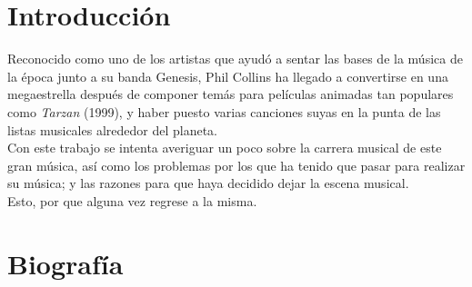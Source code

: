 \documentclass[11pt, oneside]{book}
\begin{document}
  \setcounter{page}{0}

  \tableofcontents
  
  \chapter*{Introducción}

  Reconocido como uno de los artistas que ayudó a sentar las bases de la música de la época junto a su banda Genesis, Phil Collins ha llegado a convertirse en una megaestrella después de componer temás para películas animadas tan populares como \emph{Tarzan} (1999), y haber puesto varias canciones suyas en la punta de las listas musicales alrededor del planeta.\\

  Con este trabajo se intenta averiguar un poco sobre la carrera musical de este gran música, así como los problemas por los que ha tenido que pasar para realizar su música; y las razones para que haya decidido dejar la escena musical.\\

  Esto, por que alguna vez regrese a la misma.

  \chapter{Biografía}
\end{document}
